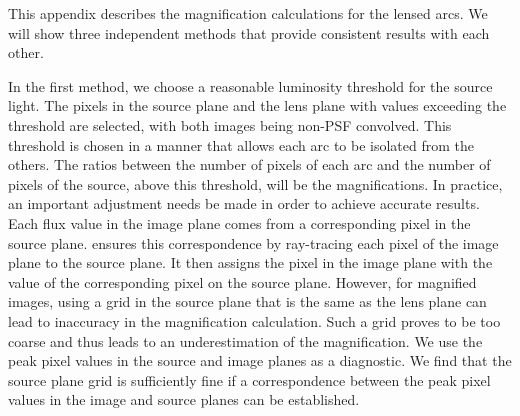This appendix describes the magnification calculations for the lensed arcs. 
We will show three independent methods that provide consistent results with each other.

In the first method, we choose a reasonable luminosity threshold for the source light. 
The pixels in the source plane and the lens plane with values exceeding the threshold are selected, with both images being non-PSF convolved. 
This threshold is chosen in a manner that allows each arc to be isolated from the others. 
The ratios between the number of pixels of each arc and the number of pixels of the source, above this threshold, will be the magnifications. 
In practice, an important adjustment needs be made in order to achieve accurate results.
Each flux value in the image plane comes from a corresponding pixel in the source plane. 
\gigal ensures this correspondence by ray-tracing each pixel of the image plane to the source plane.
It then assigns the pixel in the image plane with the value of the corresponding pixel on the source plane. 
However, for magnified images, using a grid in the source plane that is the same as the lens plane can lead to inaccuracy in the magnification calculation.
Such a grid proves to be too coarse and thus
leads to an underestimation of the magnification.
We use the peak pixel values in the source and image planes as a diagnostic.
We find that the source plane grid is sufficiently fine if a correspondence between the peak pixel values in the image and source planes can be established.
